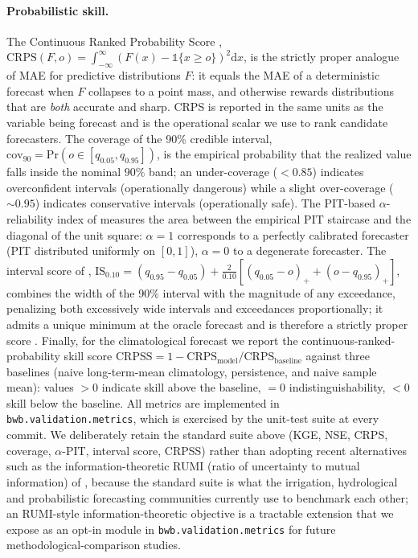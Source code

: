 \documentclass[review,5p,times]{elsarticle}
\begin{document}
\paragraph{Probabilistic skill.} The Continuous Ranked Probability
Score \citep{Hersbach2000},
$\mathrm{CRPS}(F,o) = \int_{-\infty}^{\infty} (F(x)-\mathbb{1}\{x\geq o\})^2 \mathrm{d}x$,
is the strictly proper analogue of MAE for predictive distributions
$F$: it equals the MAE of a deterministic forecast when $F$ collapses
to a point mass, and otherwise rewards distributions that are
\emph{both} accurate and sharp. CRPS is reported in the same units
as the variable being forecast and is the operational scalar we use
to rank candidate forecasters. The coverage of the 90\% credible
interval, $\mathrm{cov}_{90}=\mathrm{Pr}(o\in[q_{0.05},q_{0.95}])$,
is the empirical probability that the realized value falls inside
the nominal $90\%$ band; an under-coverage ($<0.85$) indicates
overconfident intervals (operationally dangerous) while a slight
over-coverage ($\sim 0.95$) indicates conservative intervals
(operationally safe). The PIT-based $\alpha$-reliability index of
\citet{Renard2010} measures the area between the empirical PIT
staircase and the diagonal of the unit square: $\alpha=1$ corresponds
to a perfectly calibrated forecaster (PIT distributed uniformly on
$[0,1]$), $\alpha=0$ to a degenerate forecaster. The interval score
of \citet{GneitingRaftery2007},
$\mathrm{IS}_{0.10}=(q_{0.95}-q_{0.05})+\frac{2}{0.10}[(q_{0.05}-o)_++(o-q_{0.95})_+]$,
combines the width of the 90\% interval with the magnitude of any
exceedance, penalizing both excessively wide intervals and
exceedances proportionally; it admits a unique minimum at the
oracle forecast and is therefore a strictly proper score
\citep{GneitingRaftery2007}. Finally, for the climatological forecast
we report the continuous-ranked-probability skill score $\mathrm{CRPSS}=
1-\mathrm{CRPS}_{\mathrm{model}}/\mathrm{CRPS}_{\mathrm{baseline}}$
against three baselines (naive long-term-mean climatology,
persistence, and naive sample mean): values $>0$ indicate skill
above the baseline, $=0$ indistinguishability, $<0$ skill below
the baseline. All metrics are implemented in
\texttt{bwb.validation.metrics}, which is exercised by the unit-test
suite at every commit. We deliberately retain the standard suite
above (KGE, NSE, CRPS, coverage, $\alpha$-PIT, interval score,
CRPSS) rather than adopting recent alternatives such as the
information-theoretic RUMI (ratio of uncertainty to mutual
information) of \citet{Pizarro2025RUMI}, because the standard
suite is what the irrigation, hydrological and probabilistic
forecasting communities currently use to benchmark each other; an
RUMI-style information-theoretic objective is a tractable extension
that we expose as an opt-in module in
\verb|bwb.validation.metrics| for future
methodological-comparison studies.
\end{document}
